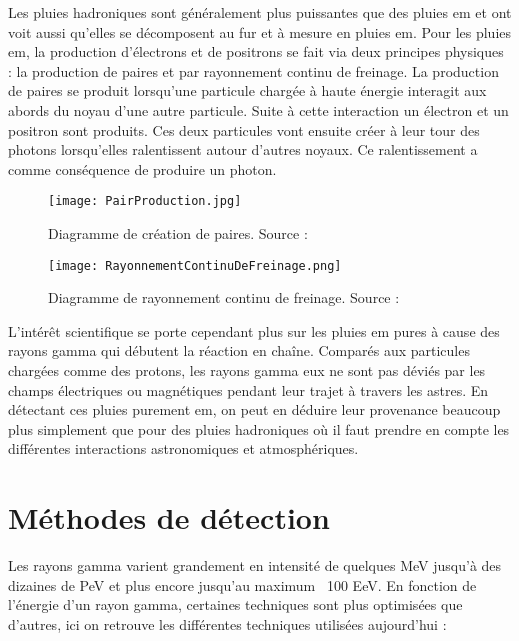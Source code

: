 Les pluies hadroniques sont généralement plus puissantes que des pluies \gls{em} et ont voit aussi qu'elles se décomposent au fur et à mesure en pluies \gls{em}.
Pour les pluies \gls{em}, la production d'électrons et de positrons se fait via deux principes physiques : la production de paires et par rayonnement continu de freinage.
La production de paires se produit lorsqu'une particule chargée à haute énergie interagit aux abords du noyau d'une autre particule.
Suite à cette interaction un électron et un positron sont produits. Ces deux particules vont ensuite créer à leur tour des photons 
lorsqu'elles ralentissent autour d'autres noyaux. Ce ralentissement a comme conséquence de produire un photon.
\newpage
\begin{figure}[!tbp]
	\centering
	\begin{minipage}[b]{0.4\textwidth}
	  \texttt{[image: PairProduction.jpg]}
	  \caption[Création de paires]{Diagramme de création de paires. Source : \cite{PairProduction}}
	\end{minipage}
	\hfill
	\begin{minipage}[b]{0.4\textwidth}
	  \texttt{[image: RayonnementContinuDeFreinage.png]}
	  \caption[Rayonnement continu de freinage]{Diagramme de rayonnement continu de freinage. Source : \cite{Bremsstrahlung}}
	\end{minipage}
\end{figure}

L'intérêt scientifique se porte cependant plus sur les pluies \gls{em} pures à cause des rayons gamma qui débutent la réaction en chaîne.
Comparés aux particules chargées comme des protons, les rayons gamma eux ne sont pas déviés par les champs électriques ou magnétiques 
pendant leur trajet à travers les astres. En détectant ces pluies purement \gls{em}, on peut en déduire leur provenance beaucoup plus simplement 
que pour des pluies hadroniques où il faut prendre en compte les différentes interactions astronomiques et atmosphériques.


\section{Méthodes de détection}
Les rayons gamma varient grandement en intensité de quelques MeV jusqu'à des dizaines de PeV et plus encore jusqu'au maximum ~100 EeV. \cite{TjarkPHD}
En fonction de l'énergie d'un rayon gamma, certaines techniques sont plus optimisées que d'autres, ici on retrouve les différentes techniques utilisées aujourd'hui :

